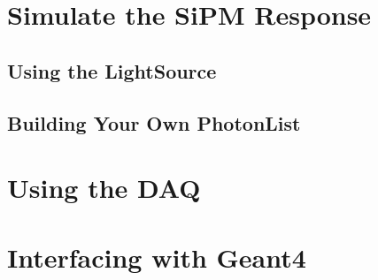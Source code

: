 \section{Simulate the SiPM Response}

\subsection{Using the LightSource}

\subsection{Building Your Own PhotonList}

\section{Using the DAQ}

\section{Interfacing with Geant4}






